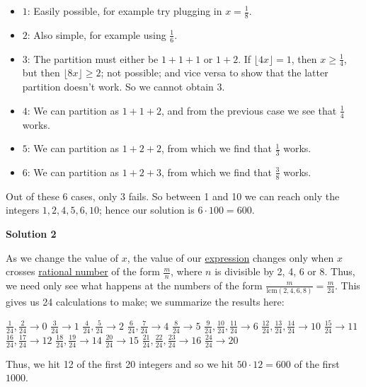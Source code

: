 \begin{enumerate}
 
            \begin{itemize}
        \item $1$: Easily possible, for example try plugging in $x =\frac 18$.
        \item $2$: Also simple, for example using $\frac 16$.
        \item $3$: The partition must either be $1+1+1$ or $1+2$. If $\lfloor 4x \rfloor = 1$, then $x \ge \frac 14$, but then $\lfloor 8x \rfloor \ge 2$; not possible; and vice versa to show that the latter partition doesn't work. So we cannot obtain $3$.
        \item $4$: We can partition as $1+1+2$, and from the previous case we see that $\frac 14$ works.
        \item $5$: We can partition as $1+2+2$, from which we find that $\frac 13$ works.
        \item $6$: We can partition as $1+2+3$, from which we find that $\frac 38$ works.
            \end{itemize}
            Out of these 6 cases, only 3 fails. So between 1 and 10 we can reach only the integers $1,2,4,5,6,10$; hence our solution is $6 \cdot 100 = \boxed{600}$.

 



\textbf{Solution 2}

As we change the value of $x$, the value of our \href{https://artofproblemsolving.com/wiki/index.php?title=Expression}{expression} changes only when $x$ crosses \href{https://artofproblemsolving.com/wiki/index.php?title=Rational\_number}{rational number} of the form $\frac{m}{n}$, where $n$ is divisible by 2, 4, 6 or 8.  Thus, we need only see what happens at the numbers of the form $\frac{m}{\textrm{lcm}(2, 4, 6, 8)} = \frac{m}{24}$.  This gives us 24 calculations to make; we summarize the results here:

 $\frac{1}{24}, \frac{2}{24} \to 0$
$\frac{3}{24} \to 1$
$\frac{4}{24}, \frac{5}{24} \to 2$
$\frac{6}{24}, \frac{7}{24} \to 4$
$\frac{8}{24} \to 5$
$\frac{9}{24}, \frac{10}{24}, \frac{11}{24} \to 6$
$\frac{12}{24}, \frac{13}{24}, \frac{14}{24} \to 10$
$\frac{15}{24} \to 11$
$\frac{16}{24},\frac{17}{24} \to 12$
$\frac{18}{24}, \frac{19}{24} \to 14$
$\frac{20}{24}\to 15$
$\frac{21}{24}, \frac{22}{24}, \frac{23}{24} \to16$
$\frac{24}{24} \to 20$

 Thus, we hit 12 of the first 20 integers and so we hit $50 \cdot 12 = \boxed{600}$ of the first $1000$.

 




\end{enumerate}
